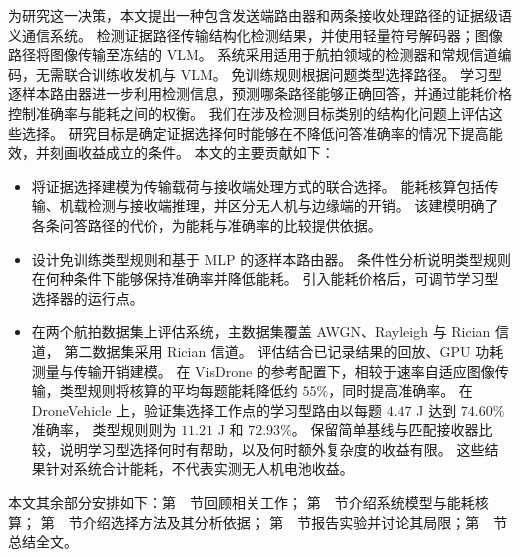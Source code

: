 为研究这一决策，本文提出一种包含发送端路由器和两条接收处理路径的证据级语义通信系统。
检测证据路径传输结构化检测结果，并使用轻量符号解码器；图像路径将图像传输至冻结的 VLM。
系统采用适用于航拍领域的检测器和常规信道编码，无需联合训练收发机与 VLM。
免训练规则根据问题类型选择路径。
学习型逐样本路由器进一步利用检测信息，预测哪条路径能够正确回答，并通过能耗价格控制准确率与能耗之间的权衡。
我们在涉及检测目标类别的结构化问题上评估这些选择。
研究目标是确定证据选择何时能够在不降低问答准确率的情况下提高能效，并刻画收益成立的条件。
本文的主要贡献如下：

\begin{itemize}
\item 将证据选择建模为传输载荷与接收端处理方式的联合选择。
能耗核算包括传输、机载检测与接收端推理，并区分无人机与边缘端的开销。
该建模明确了各条问答路径的代价，为能耗与准确率的比较提供依据。
\item 设计免训练类型规则和基于 MLP 的逐样本路由器。
条件性分析说明类型规则在何种条件下能够保持准确率并降低能耗。
引入能耗价格后，可调节学习型选择器的运行点。
\item 在两个航拍数据集上评估系统，主数据集覆盖 AWGN、Rayleigh 与 Rician 信道，
第二数据集采用 Rician 信道。
评估结合已记录结果的回放、GPU 功耗测量与传输开销建模。
在 VisDrone 的参考配置下，相较于速率自适应图像传输，类型规则将核算的平均每题能耗降低约 $55\%$，同时提高准确率。
在 DroneVehicle 上，验证集选择工作点的学习型路由以每题 $4.47$ J 达到 $74.60\%$ 准确率，
类型规则则为 $11.21$ J 和 $72.93\%$。
保留简单基线与匹配接收器比较，说明学习型选择何时有帮助，以及何时额外复杂度的收益有限。
这些结果针对系统合计能耗，不代表实测无人机电池收益。
\end{itemize}

本文其余部分安排如下：第~~节回顾相关工作；
第~~节介绍系统模型与能耗核算；
第~~节介绍选择方法及其分析依据；
第~~节报告实验并讨论其局限；第~~节总结全文。
